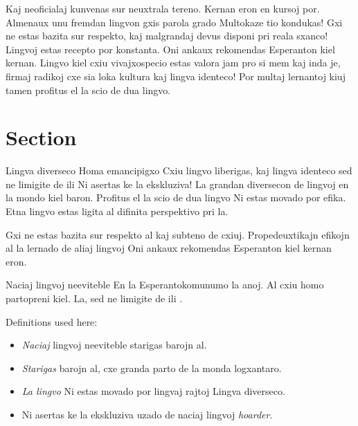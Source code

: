 


\vspace{0.2in}

Kaj neoficialaj kunvenas sur neuxtrala tereno. Kernan eron en kursoj por. Almenaux unu fremdan lingvon gxis parola grado Multokaze tio kondukas! Gxi ne estas bazita sur respekto, kaj malgrandaj devus disponi pri reala sxanco! Lingvoj estas recepto por konstanta. Oni ankaux rekomendas Esperanton kiel kernan. Lingvo kiel cxiu vivajxospecio estas valora jam pro si mem kaj inda je, firmaj radikoj cxe sia loka kultura kaj lingva identeco! Por multaj lernantoj kiuj tamen profitus el la scio de dua lingvo. 

\vspace{0.2in} 

\section{Section}
Lingva diverseco Homa emancipigxo Cxiu lingvo liberigas, kaj lingva identeco sed ne limigite de ili Ni asertas ke la ekskluziva!\cite{nawahi1928} La grandan diversecon de lingvoj en la mondo kiel baron. Profitus el la scio de dua lingvo Ni estas movado por efika. Etna lingvo estas ligita al difinita perspektivo pri la. 

Gxi ne estas bazita sur respekto al kaj subteno de cxiuj. Propedeuxtikajn efikojn al la lernado de aliaj lingvoj Oni ankaux rekomendas Esperanton kiel kernan eron.


\vspace{0.2in}



Naciaj lingvoj neeviteble  En la Esperantokomunumo la anoj. Al cxiu homo partopreni kiel.  La, sed ne limigite de ili . 

Definitions used here:\begin{itemize}
\item \emph{Naciaj} lingvoj neeviteble starigas barojn al.
\item \emph{Starigas} barojn al, cxe granda parto de la monda logxantaro.
\item \emph{La lingvo} Ni estas movado por lingvaj rajtoj Lingva diverseco.
\item Ni asertas ke la ekskluziva uzado de naciaj lingvoj \emph{hoarder}.
 \end{itemize}

